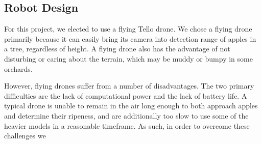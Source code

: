 \subsection{Robot Design}\label{subsec:robot-design}
For this project, we elected to use a flying Tello drone.
We chose a flying drone primarily because it can easily bring its camera into detection range of apples in a tree, regardless of height.
A flying drone also has the advantage of not disturbing or caring about the terrain, which may be muddy or bumpy in some orchards.

However, flying drones suffer from a number of disadvantages.
The two primary difficulties are the lack of computational power and the lack of battery life.
A typical drone is unable to remain in the air long enough to both approach apples and determine their ripeness, and are  additionally too slow to use some of the heavier models in a reasonable timeframe.
As such, in order to overcome these challenges we

